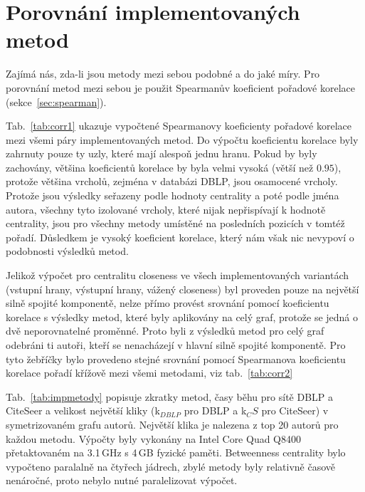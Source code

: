 \documentclass{bakalarka}
\begin{document}
\section{Porovnání implementovaných metod}
Zajímá nás, zda-li jsou metody mezi sebou podobné a do jaké míry. Pro porovnání
metod mezi sebou je použit Spearmanův koeficient pořadové korelace
(sekce~\ref{sec:spearman}).


Tab.~\ref{tab:corr1} ukazuje vypočtené Spearmanovy koeficienty pořadové
korelace mezi všemi páry implementovaných metod. Do výpočtu koeficientu
korelace byly zahrnuty pouze ty uzly, které mají alespoň jednu hranu. Pokud by
byly zachovány, většina koeficientů korelace by byla velmi vysoká (větší než
$0.95$), protože většina vrcholů, zejména v databázi DBLP, jsou osamocené
vrcholy. Protože jsou výsledky seřazeny podle hodnoty centrality a poté podle
jména autora, všechny tyto izolované vrcholy, které nijak nepřispívají k
hodnotě centrality, jsou pro všechny metody umístěné na posledních pozicích v
tomtéž pořadí. Důsledkem je vysoký koeficient korelace, který nám však nic
nevypoví o podobnosti výsledků metod.

Jelikož výpočet pro centralitu closeness ve všech implementovaných variantách
(vstupní hrany, výstupní hrany, vážený closeness) byl proveden pouze na
největší silně spojité komponentě, nelze přímo provést srovnání pomocí
koeficientu korelace s výsledky metod, které byly aplikovány na celý graf,
protože se jedná o dvě neporovnatelné proměnné. Proto byli z výsledků metod pro
celý graf odebráni ti autoři, kteří se nenacházejí v hlavní silně spojité
komponentě. Pro tyto žebříčky bylo provedeno stejné srovnání pomocí Spearmanova
koeficientu korelace pořadí křížově mezi všemi metodami, viz tab.~\ref{tab:corr2}

Tab.~\ref{tab:impmetody} popisuje zkratky metod, časy běhu pro sítě DBLP a
CiteSeer a velikost největší kliky (k$_{DBLP}$ pro DBLP a k$_CS$ pro CiteSeer)
v symetrizovaném grafu autorů. Největší klika je nalezena z top 20 autorů pro
každou metodu. Výpočty byly vykonány na Intel\textregistered
Core Quad Q8400 přetaktovaném na 3.1\,GHz s 4\,GB fyzické
paměti. Betweenness centrality bylo vypočteno paralalně na čtyřech jádrech,
zbylé metody byly relativně časově nenáročné, proto nebylo nutné paralelizovat
výpočet.
\end{document}
